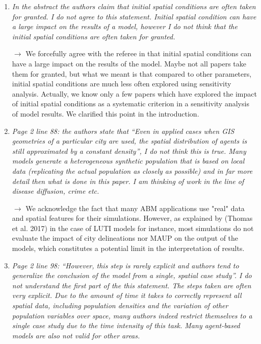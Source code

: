 \documentclass[11pt,a4paper,sans]{moderncv}        %
\begin{document}

\begin{enumerate}
	\item \textit{In the abstract the authors claim that initial spatial conditions are often taken for granted. I do not agree to this statement. Initial spatial condition can have a large impact on the results of a model, however I do not think that the initial spatial conditions are often taken for granted.}
	
	\medskip
	
	$\rightarrow$ We forcefully agree with the referee in that initial spatial conditions can have a large impact on the results of the model. Maybe not all papers take them for granted, but what we meant is that compared to other parameters, initial spatial conditions are much less often explored using sensitivity analysis. Actually, we know only a few papers which have explored the impact of initial spatial conditions as a systematic criterion in a sensitivity analysis of model results. We clarified this point in the introduction.
	\bigskip

	\item \textit{Page 2 line 88: the authors state that “Even in applied cases when GIS geometries of a particular city are used, the spatial distribution of agents is still approximated by a constant density”, I do not think this is true. Many models generate a heterogeneous synthetic population that is based on local data (replicating the actual population as closely as possible) and in far more detail then what is done in this paper. I am thinking of work in the line of disease diffusion, crime etc.}
	
	\medskip
	
	$\rightarrow$ We acknowledge the fact that many ABM applications use "real" data and spatial features for their simulations. However, as explained by (Thomas et al. 2017) in the case of LUTI models for instance, most simulations do not evaluate the impact of city delineations nor MAUP on the output of the models, which constitutes a potential limit in the interpretation of results.
	\bigskip
	
	\item \textit{Page 2 line 98: “However, this step is rarely explicit and authors tend to generalize the conclusion of the model from a single, spatial case study”. I do not understand the first part of the this statement. The steps taken are often very explicit. Due to the amount of time it takes to correctly represent all spatial data, including population densities and the variation of other population variables over space, many authors indeed restrict themselves to a single case study due to the time intensity of this task. Many agent-based models are also not valid for other areas.}
	

\end{enumerate}
\end{document}
